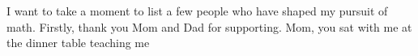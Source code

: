 

%

I want to take a moment to list a few people who have shaped my pursuit of math.  Firstly, thank you Mom and Dad for supporting.  Mom, you sat with me at the dinner table teaching me 


%
